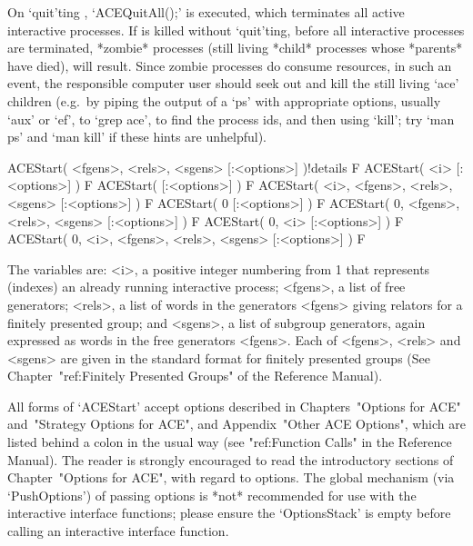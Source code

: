On `quit'ting {\GAP}, `ACEQuitAll();' is  executed,  which  terminates
all active interactive {\ACE} processes. If {\GAP} is  killed  without
`quit'ting, before all interactive {\ACE}  processes  are  terminated,
*zombie* processes (still living  *child*  processes  whose  *parents*
have died), will result. Since zombie processes do consume  resources,
in such an event, the responsible computer user should  seek  out  and
kill the still living `ace' children (e.g.~by piping the output  of  a
`ps' with appropriate options, usually `aux' or `ef', to  `grep  ace',
to find the process ids, and then using `kill'; try `man ps' and  `man
kill' if these hints are unhelpful).


\>ACEStart( <fgens>, <rels>, <sgens> [:<options>] )!{details} F
\>ACEStart( <i> [:<options>] ) F
\>ACEStart( [:<options>] ) F
\>ACEStart( <i>, <fgens>, <rels>, <sgens> [:<options>] ) F
\>ACEStart( 0 [:<options>] ) F
\>ACEStart( 0, <fgens>, <rels>, <sgens> [:<options>] ) F
\>ACEStart( 0, <i> [:<options>] ) F
\>ACEStart( 0, <i>, <fgens>, <rels>, <sgens> [:<options>] ) F

The variables are: <i>, a  positive  integer  numbering  from  1  that
represents (indexes) an already running  interactive  {\ACE}  process;
<fgens>, a list of free generators; <rels>, a list  of  words  in  the
generators <fgens> giving relators for a finitely presented group; and
<sgens>, a list of subgroup generators, again expressed  as  words  in
the free generators <fgens>. Each of <fgens>, <rels> and  <sgens>  are
given in the standard {\GAP} format for finitely presented groups (See
Chapter~"ref:Finitely  Presented  Groups"  of  the  {\GAP}   Reference
Manual).

All forms of `ACEStart' accept options described in  Chapters~"Options
for ACE" and~"Strategy  Options  for  ACE",  and  Appendix~"Other  ACE
Options", which are listed behind  a  colon  in  the  usual  way  (see
"ref:Function Calls" in the {\GAP} Reference Manual).  The  reader  is
strongly   encouraged   to   read   the   introductory   sections   of
Chapter~"Options  for  ACE",  with  regard  to  options.  The   global
mechanism (via `PushOptions') of passing options is *not*  recommended
for use with the interactive {\ACE} interface functions; please ensure
the `OptionsStack' is  empty  before  calling  an  interactive  {\ACE}
interface function. 

